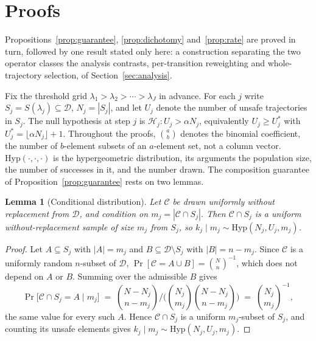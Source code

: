 \documentclass{article} %
\newtheorem{lemma}{Lemma}
\newcommand{\Doff}{\mathcal{D}}
\begin{document}
\section{Proofs}
\label{app:proof}

Propositions~\ref{prop:guarantee}, \ref{prop:dichotomy} and~\ref{prop:rate} are proved in
turn, followed by one result stated only here: a construction separating the two operator
classes the analysis contrasts, per-transition reweighting and whole-trajectory selection,
of Section~\ref{sec:analysis}.

Fix the threshold grid $\lambda_1 > \lambda_2 > \cdots > \lambda_J$ in advance. For each $j$ write $S_j = S(\lambda_j) \subseteq \Doff$, $N_j = |S_j|$, and let $U_j$ denote the number of unsafe trajectories in $S_j$. The null hypothesis at step $j$ is $\mathcal{H}_j: U_j > \alpha N_j$, equivalently $U_j \ge U_j^{*}$ with $U_j^{*} = \lfloor \alpha N_j \rfloor + 1$. Throughout the proofs,
$\binom{a}{b}$ denotes the binomial coefficient, the number of $b$-element subsets of an
$a$-element set, not a column vector. $\mathrm{Hyp}(\cdot, \cdot, \cdot)$ is the hypergeometric
distribution, its arguments the population size, the number of successes in it, and the
number drawn.
The composition guarantee of Proposition~\ref{prop:guarantee} rests on two lemmas.

\begin{lemma}[Conditional distribution]
\label{lem:conddist}
Let $\mathcal{C}$ be drawn uniformly without replacement from $\Doff$, and condition on $m_j = |\mathcal{C} \cap S_j|$. Then $\mathcal{C} \cap S_j$ is a uniform without-replacement sample of size $m_j$ from $S_j$, so $k_j \mid m_j \sim \mathrm{Hyp}(N_j, U_j, m_j)$.
\end{lemma}

\begin{proof}
Let $A \subseteq S_j$ with $|A| = m_j$ and $B \subseteq \Doff \setminus S_j$ with
$|B| = n - m_j$. Since $\mathcal{C}$ is a uniformly random $n$-subset of $\Doff$,
$\Pr[\mathcal{C} = A \cup B] = \binom{N}{n}^{-1}$, which does not depend on $A$ or $B$.
Summing over the admissible $B$ gives
\[
  \Pr\big[\mathcal{C} \cap S_j = A \mid m_j\big]
  \;=\; \binom{N - N_j}{n - m_j} \Big/ \Big(\binom{N_j}{m_j}\binom{N - N_j}{n - m_j}\Big)
  \;=\; \binom{N_j}{m_j}^{-1},
\]
the same value for every such $A$. Hence $\mathcal{C} \cap S_j$
is a uniform $m_j$-subset of $S_j$, and counting its unsafe elements gives $k_j \mid m_j
\sim \mathrm{Hyp}(N_j, U_j, m_j)$.
\end{proof}
\end{document}
